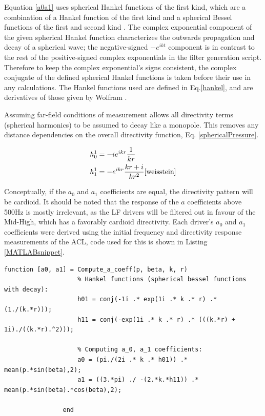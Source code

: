 \documentclass{report}
\begin{document}
            Equation \ref{a0a1} uses spherical Hankel functions of the first kind, which are a combination of a Hankel function of the first kind and a spherical Bessel functions of the first and second kind \cite{weisstein}.
            The complex exponential component of the given spherical Hankel function characterizes the outwards propagation and decay of a spherical wave; the negative-signed $-e^{ikt}$ component is in contrast to the rest of the positive-signed complex exponentials in the filter generation script.
            Therefore to keep the complex exponential's signs consistent, the complex conjugate of the defined spherical Hankel functions is taken before their use in any calculations.
            The Hankel functions used are defined in Eq.\ref{hankel}, and are derivatives of those given by Wolfram \cite{weisstein}.

            Assuming far-field conditions of measurement allows all directivity terms (spherical harmonics) to be assumed to decay like a monopole.
            This removes any distance dependencies on the overall directivity function, Eq. \ref{sphericalPressure}.

            \begin{equation}
                \begin{split}
                    h_0^1 &= -i  e^{ikr}  \frac{1}{kr} \\
                    h_1^1 &= -e^{ikr}  \frac{kr + i}{kr^2}
                    \label{hankel} \cite{weisstein}
                \end{split}
            \end{equation}

            Conceptually, if the $a_0$ and $a_1$ coefficients are equal, the directivity pattern will be cardioid.
            It should be noted that the response of the $a$ coefficients above 500Hz is mostly irrelevant, as the LF drivers will be filtered out in favour of the Mid-High, which has a favorably cardioid directivity.
            Each driver's $a_0$ and $a_1$ coefficients were derived using the initial frequency and directivity response measurements of the ACL, code used for this is shown in Listing \ref{MATLABsnippet}.

            \begin{lstlisting}[style=Matlab-editor, gobble=16, caption = {MATLAB function used to calculate $a$ coefficients using measured pressure $p$.}, label = {MATLABsnippet}]
                function [a0, a1] = Compute_a_coeff(p, beta, k, r)
                    % Hankel functions (spherical bessel functions with decay):
                    h01 = conj(-1i .* exp(1i .* k .* r) .* (1./(k.*r)));
                    h11 = conj(-exp(1i .* k .* r) .* (((k.*r) + 1i)./((k.*r).^2)));

                    % Computing a_0, a_1 coefficients:
                    a0 = (pi./(2i .* k .* h01)) .* mean(p.*sin(beta),2);
                    a1 = ((3.*pi) ./ -(2.*k.*h11)) .* mean(p.*sin(beta).*cos(beta),2);
                
                end
                
            \end{lstlisting}
            
\end{document}
